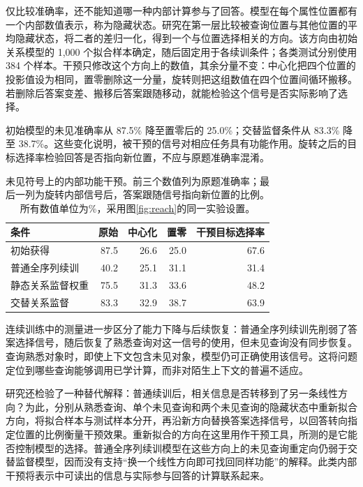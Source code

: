 仅比较准确率，还不能知道哪一种内部计算参与了回答。模型在每个属性位置都有一个内部数值表示，称为隐藏状态。研究在第一层比较被查询位置与其他位置的平均隐藏状态，将二者的差归一化，得到一个与位置选择相关的方向。该方向由初始关系模型的 1,000 个拟合样本确定，随后固定用于各续训条件；各类测试分别使用 384 个样本。干预只修改这个方向上的数值，其余分量不变：中心化把四个位置的投影值设为相同，置零删除这一分量，旋转则把这组数值在四个位置间循环搬移。若删除后答案变差、搬移后答案跟随移动，就能检验这个信号是否实际影响了选择。

初始模型的未见准确率从 87.5\% 降至置零后的 25.0\%；交替监督条件从 83.3\% 降至 38.7\%。这些变化说明，被干预的信号对相应任务具有功能作用。旋转之后的目标选择率检验回答是否指向新位置，不应与原题准确率混淆。

\begin{table}[htbp]
\caption{未见符号上的内部功能干预。前三个数值列为原题准确率；最后一列为旋转内部信号后，答案跟随信号指向新位置的比例。所有数值单位为\%，采用图\ref{fig:reach}的同一实验设置。}
\label{tab:intervention}
\begin{tabularx}{\linewidth}{@{}Yrrrr@{}}
\toprule 条件 & 原始 & 中心化 & 置零 & 干预目标选择率\\\midrule
初始获得 & 87.5 & 26.6 & 25.0 & 67.6\\
普通全序列续训 & 40.2 & 25.1 & 31.1 & 31.4\\
静态关系监督权重 & 75.5 & 31.3 & 33.6 & 48.2\\
交替关系监督 & 83.3 & 32.9 & 38.7 & 63.9\\
\bottomrule
\end{tabularx}
\end{table}

连续训练中的测量进一步区分了能力下降与后续恢复：普通全序列续训先削弱了答案选择信号，随后恢复了熟悉查询对这一信号的使用，但未见查询没有同步恢复。查询熟悉对象时，即使上下文包含未见对象，模型仍可正确使用该信号。这将问题定位到哪些查询能够调用已学计算，而非对陌生上下文的普遍不适应。

研究还检验了一种替代解释：普通续训后，相关信息是否转移到了另一条线性方向？为此，分别从熟悉查询、单个未见查询和两个未见查询的隐藏状态中重新拟合方向，将拟合样本与测试样本分开，再沿新方向替换答案选择信号，以回答转向指定位置的比例衡量干预效果。重新拟合的方向在这里用作干预工具，所测的是它能否控制模型的选择。普通全序列续训模型在这些方向上的未见查询重定向仍弱于交替监督模型，因而没有支持“换一个线性方向即可找回同样功能”的解释。此类内部干预将表示中可读出的信息与实际参与回答的计算联系起来\citep{geiger2021causal,zhang2024patching}。

